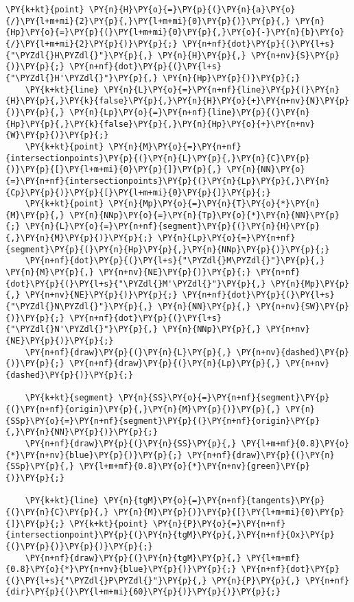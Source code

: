 \begin{Verbatim}[commandchars=\\\{\}]
    \PY{k+kt}{point} \PY{n}{H}\PY{o}{=}\PY{p}{(}\PY{n}{a}\PY{o}{/}\PY{l+m+mi}{2}\PY{p}{,}\PY{l+m+mi}{0}\PY{p}{)}\PY{p}{,} \PY{n}{Hp}\PY{o}{=}\PY{p}{(}\PY{l+m+mi}{0}\PY{p}{,}\PY{o}{-}\PY{n}{b}\PY{o}{/}\PY{l+m+mi}{2}\PY{p}{)}\PY{p}{;} \PY{n+nf}{dot}\PY{p}{(}\PY{l+s}{"\PYZdl{}H\PYZdl{}"}\PY{p}{,} \PY{n}{H}\PY{p}{,} \PY{n+nv}{S}\PY{p}{)}\PY{p}{;} \PY{n+nf}{dot}\PY{p}{(}\PY{l+s}{"\PYZdl{}H'\PYZdl{}"}\PY{p}{,} \PY{n}{Hp}\PY{p}{)}\PY{p}{;}
    \PY{k+kt}{line} \PY{n}{L}\PY{o}{=}\PY{n+nf}{line}\PY{p}{(}\PY{n}{H}\PY{p}{,}\PY{k}{false}\PY{p}{,}\PY{n}{H}\PY{o}{+}\PY{n+nv}{N}\PY{p}{)}\PY{p}{,} \PY{n}{Lp}\PY{o}{=}\PY{n+nf}{line}\PY{p}{(}\PY{n}{Hp}\PY{p}{,}\PY{k}{false}\PY{p}{,}\PY{n}{Hp}\PY{o}{+}\PY{n+nv}{W}\PY{p}{)}\PY{p}{;}
    \PY{k+kt}{point} \PY{n}{M}\PY{o}{=}\PY{n+nf}{intersectionpoints}\PY{p}{(}\PY{n}{L}\PY{p}{,}\PY{n}{C}\PY{p}{)}\PY{p}{[}\PY{l+m+mi}{0}\PY{p}{]}\PY{p}{,} \PY{n}{NN}\PY{o}{=}\PY{n+nf}{intersectionpoints}\PY{p}{(}\PY{n}{Lp}\PY{p}{,}\PY{n}{Cp}\PY{p}{)}\PY{p}{[}\PY{l+m+mi}{0}\PY{p}{]}\PY{p}{;}
    \PY{k+kt}{point} \PY{n}{Mp}\PY{o}{=}\PY{n}{T}\PY{o}{*}\PY{n}{M}\PY{p}{,} \PY{n}{NNp}\PY{o}{=}\PY{n}{Tp}\PY{o}{*}\PY{n}{NN}\PY{p}{;} \PY{n}{L}\PY{o}{=}\PY{n+nf}{segment}\PY{p}{(}\PY{n}{H}\PY{p}{,}\PY{n}{M}\PY{p}{)}\PY{p}{;} \PY{n}{Lp}\PY{o}{=}\PY{n+nf}{segment}\PY{p}{(}\PY{n}{Hp}\PY{p}{,}\PY{n}{NNp}\PY{p}{)}\PY{p}{;}
    \PY{n+nf}{dot}\PY{p}{(}\PY{l+s}{"\PYZdl{}M\PYZdl{}"}\PY{p}{,} \PY{n}{M}\PY{p}{,} \PY{n+nv}{NE}\PY{p}{)}\PY{p}{;} \PY{n+nf}{dot}\PY{p}{(}\PY{l+s}{"\PYZdl{}M'\PYZdl{}"}\PY{p}{,} \PY{n}{Mp}\PY{p}{,} \PY{n+nv}{NE}\PY{p}{)}\PY{p}{;} \PY{n+nf}{dot}\PY{p}{(}\PY{l+s}{"\PYZdl{}N\PYZdl{}"}\PY{p}{,} \PY{n}{NN}\PY{p}{,} \PY{n+nv}{SW}\PY{p}{)}\PY{p}{;} \PY{n+nf}{dot}\PY{p}{(}\PY{l+s}{"\PYZdl{}N'\PYZdl{}"}\PY{p}{,} \PY{n}{NNp}\PY{p}{,} \PY{n+nv}{NE}\PY{p}{)}\PY{p}{;}
    \PY{n+nf}{draw}\PY{p}{(}\PY{n}{L}\PY{p}{,} \PY{n+nv}{dashed}\PY{p}{)}\PY{p}{;} \PY{n+nf}{draw}\PY{p}{(}\PY{n}{Lp}\PY{p}{,} \PY{n+nv}{dashed}\PY{p}{)}\PY{p}{;}

    \PY{k+kt}{segment} \PY{n}{SS}\PY{o}{=}\PY{n+nf}{segment}\PY{p}{(}\PY{n+nf}{origin}\PY{p}{,}\PY{n}{M}\PY{p}{)}\PY{p}{,} \PY{n}{SSp}\PY{o}{=}\PY{n+nf}{segment}\PY{p}{(}\PY{n+nf}{origin}\PY{p}{,}\PY{n}{NN}\PY{p}{)}\PY{p}{;}
    \PY{n+nf}{draw}\PY{p}{(}\PY{n}{SS}\PY{p}{,} \PY{l+m+mf}{0.8}\PY{o}{*}\PY{n+nv}{blue}\PY{p}{)}\PY{p}{;} \PY{n+nf}{draw}\PY{p}{(}\PY{n}{SSp}\PY{p}{,} \PY{l+m+mf}{0.8}\PY{o}{*}\PY{n+nv}{green}\PY{p}{)}\PY{p}{;}

    \PY{k+kt}{line} \PY{n}{tgM}\PY{o}{=}\PY{n+nf}{tangents}\PY{p}{(}\PY{n}{C}\PY{p}{,} \PY{n}{M}\PY{p}{)}\PY{p}{[}\PY{l+m+mi}{0}\PY{p}{]}\PY{p}{;} \PY{k+kt}{point} \PY{n}{P}\PY{o}{=}\PY{n+nf}{intersectionpoint}\PY{p}{(}\PY{n}{tgM}\PY{p}{,}\PY{n+nf}{Ox}\PY{p}{(}\PY{p}{)}\PY{p}{)}\PY{p}{;}
    \PY{n+nf}{draw}\PY{p}{(}\PY{n}{tgM}\PY{p}{,} \PY{l+m+mf}{0.8}\PY{o}{*}\PY{n+nv}{blue}\PY{p}{)}\PY{p}{;} \PY{n+nf}{dot}\PY{p}{(}\PY{l+s}{"\PYZdl{}P\PYZdl{}"}\PY{p}{,} \PY{n}{P}\PY{p}{,} \PY{n+nf}{dir}\PY{p}{(}\PY{l+m+mi}{60}\PY{p}{)}\PY{p}{)}\PY{p}{;}


\end{Verbatim}
